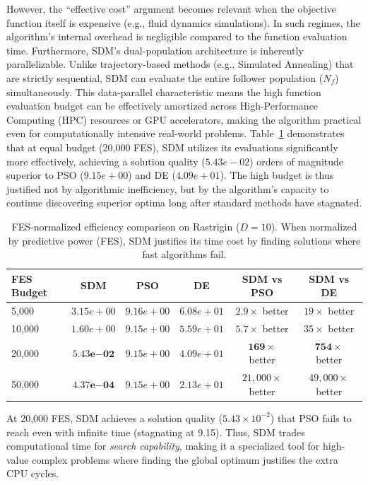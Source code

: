 \documentclass[11pt]{article}
\begin{document}
However, the ``effective cost'' argument becomes relevant when the objective function itself is expensive (e.g., fluid dynamics simulations). In such regimes, the algorithm's internal overhead is negligible compared to the function evaluation time. Furthermore, SDM's dual-population architecture is inherently parallelizable. Unlike trajectory-based methods (e.g., Simulated Annealing) that are strictly sequential, SDM can evaluate the entire follower population ($N_f$) simultaneously. This data-parallel characteristic means the high function evaluation budget can be effectively amortized across High-Performance Computing (HPC) resources or GPU accelerators, making the algorithm practical even for computationally intensive real-world problems. Table~\ref{tab:fes_efficiency} demonstrates that at equal budget (20,000 FES), SDM utilizes its evaluations significantly more effectively, achieving a solution quality ($5.43e-02$) orders of magnitude superior to PSO ($9.15e+00$) and DE ($4.09e+01$). The high budget is thus justified not by algorithmic inefficiency, but by the algorithm's capacity to continue discovering superior optima long after standard methods have stagnated.

\begin{table}[ht]
\centering
\caption{FES-normalized efficiency comparison on Rastrigin ($D=10$). When normalized by predictive power (FES), SDM justifies its time cost by finding solutions where fast algorithms fail.}
\label{tab:fes_efficiency}
\small
\begin{tabular}{@{}lccccc@{}}
\toprule
\textbf{FES Budget} & \textbf{SDM} & \textbf{PSO} & \textbf{DE} & \textbf{SDM vs PSO} & \textbf{SDM vs DE} \\
\midrule
5,000 & $3.15e+00$ & $9.16e+00$ & $6.08e+01$ & $2.9\times$ better & $19\times$ better \\
10,000 & $1.60e+00$ & $9.15e+00$ & $5.59e+01$ & $5.7\times$ better & $35\times$ better \\
20,000 & $\mathbf{5.43e{-02}}$ & $9.15e+00$ & $4.09e+01$ & $\mathbf{169\times}$ better & $\mathbf{754\times}$ better \\
50,000 & $\mathbf{4.37e{-04}}$ & $9.15e+00$ & $2.13e+01$ & $21,\!000\times$ better & $49,\!000\times$ better \\
\bottomrule
\end{tabular}
\end{table}

At 20,000 FES, SDM achieves a solution quality ($5.43 \times 10^{-2}$) that PSO fails to reach even with infinite time (stagnating at 9.15). Thus, SDM trades computational time for \textit{search capability}, making it a specialized tool for high-value complex problems where finding the global optimum justifies the extra CPU cycles.
\end{document}
